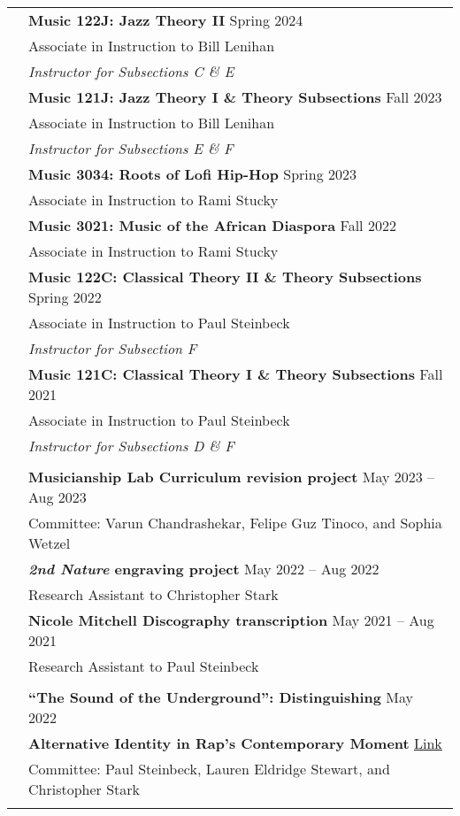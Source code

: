 \documentclass[letterpaper, 11pt]{article}
\begin{document}
\begin{longtable}{p{1.3in}p{4.8in}}
{\color{OliveGreen}{Courses Taught}} 
& \textbf{Music 122J: Jazz Theory II} \hfill Spring 2024 \\
& Associate in Instruction to Bill Lenihan \\
& \textit{Instructor for Subsections C \& E} \\
& \textbf{Music 121J: Jazz Theory I \& Theory Subsections} \hfill Fall 2023 \\
& Associate in Instruction to Bill Lenihan \\
& \textit{Instructor for Subsections E \& F} \\
& \textbf{Music 3034: Roots of Lofi Hip-Hop} \hfill Spring 2023 \\
& Associate in Instruction to Rami Stucky \\
& \textbf{Music 3021: Music of the African Diaspora} \hfill Fall 2022 \\
& Associate in Instruction to Rami Stucky \\
& \textbf{Music 122C: Classical Theory II \& Theory Subsections} \hfill Spring 2022 \\
& Associate in Instruction to Paul Steinbeck \\
& \textit{Instructor for Subsection F} \\
& \textbf{Music 121C: Classical Theory I \& Theory Subsections} \hfill Fall 2021 \\
& Associate in Instruction to Paul Steinbeck \\
& \textit{Instructor for Subsections D \& F} \\
& \\

\nohyphens{\color{OliveGreen}{Research Projects}} 
& \textbf{Musicianship Lab Curriculum revision project} \hfill May 2023 -- Aug 2023 \\
& Committee: Varun Chandrashekar, Felipe Guz Tinoco, and Sophia Wetzel \\
& \textbf{\textit{2nd Nature} engraving project}  \hfill May 2022 -- Aug 2022\\
& Research Assistant to Christopher Stark \\
& \textbf{Nicole Mitchell Discography transcription} \hfill May 2021 -- Aug 2021 \\
& Research Assistant to Paul Steinbeck \\
& \\

\newpage
\nohyphens{\color{OliveGreen}{Writing Projects}} 
& \textbf{``The Sound of the Underground'': Distinguishing} \hfill{May 2022} \\
& \textbf{Alternative Identity in Rap's Contemporary Moment} \hfill \href{https://doi.org/10.7936/cftv-at63}{Link} \\
& Committee: Paul Steinbeck, Lauren Eldridge Stewart, and Christopher Stark \\
& \\


\end{longtable}
\end{document}
